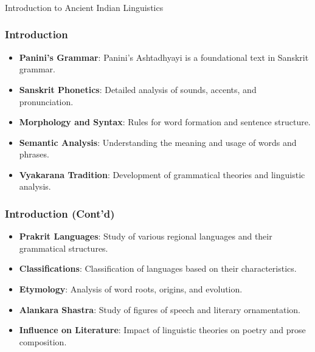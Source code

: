 \begin{frame}[fragile]\frametitle{}
\begin{center}
{\Large Introduction to Ancient Indian Linguistics}
\end{center}
\end{frame}

\begin{frame}[fragile]\frametitle{Introduction}
    
    \begin{itemize}
        \item \textbf{Panini's Grammar}: Panini's Ashtadhyayi is a foundational text in Sanskrit grammar.
        \item \textbf{Sanskrit Phonetics}: Detailed analysis of sounds, accents, and pronunciation.
        \item \textbf{Morphology and Syntax}: Rules for word formation and sentence structure.
        \item \textbf{Semantic Analysis}: Understanding the meaning and usage of words and phrases.
        \item \textbf{Vyakarana Tradition}: Development of grammatical theories and linguistic analysis.
    \end{itemize}
\end{frame}

\begin{frame}[fragile]\frametitle{ Introduction (Cont'd)}
    
    \begin{itemize}
        \item \textbf{Prakrit Languages}: Study of various regional languages and their grammatical structures.
        \item \textbf{Classifications}: Classification of languages based on their characteristics.
        \item \textbf{Etymology}: Analysis of word roots, origins, and evolution.
        \item \textbf{Alankara Shastra}: Study of figures of speech and literary ornamentation.
        \item \textbf{Influence on Literature}: Impact of linguistic theories on poetry and prose composition.
    \end{itemize}
\end{frame}
